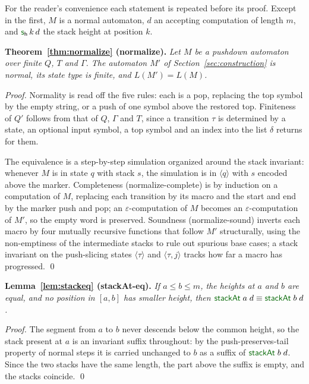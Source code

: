 \documentclass[runningheads]{llncs}
\newcommand{\greenFG}[1]{\textcolor[rgb]{0,0.4,0}{#1}}
\newcommand{\F}[1]{{\greenFG{\textsf{#1}}}}     %
\newcommand{\kG}{\ensuremath{\Gamma}}   %
\begin{document}
For the reader's convenience each statement is repeated before its proof. Except
in the first, $M$ is a normal automaton, $d$ an accepting computation of length
$m$, and $\F{s}_{\mathsf h}\,k\,d$ the stack height at position $k$.

\medskip
\noindent\textbf{Theorem~\ref{thm:normalize} (\F{normalize}).}
\emph{Let $M$ be a pushdown automaton over finite $Q$, $T$ and $\kG$. The
automaton $M'$ of Section~\ref{sec:construction} is normal, its state type is
finite, and $L(M') = L(M)$.}
\begin{proof}
Normality is read off the five rules: each is a pop, replacing the top symbol by
the empty string, or a push of one symbol above the restored top. Finiteness of
$Q'$ follows from that of $Q$, $\kG$ and $T$, since a transition $\tau$ is
determined by a state, an optional input symbol, a top symbol and an index into
the list $\delta$ returns for them.

The equivalence is a step-by-step simulation organized around the stack
invariant: whenever $M$ is in state $q$ with stack $s$, the simulation is in
$\langle q\rangle$ with $s$ encoded above the marker. Completeness
(\F{normalize-complete}) is by induction on a computation of $M$, replacing each
transition by its macro and the start and end by the marker push and pop; an
$\varepsilon$-computation of $M$ becomes an $\varepsilon$-computation of $M'$, so
the empty word is preserved. Soundness (\F{normalize-sound}) inverts each macro
by four mutually recursive functions that follow $M'$ structurally, using the
non-emptiness of the intermediate stacks to rule out spurious base cases; a stack
invariant on the push-slicing states $\langle\tau\rangle$ and
$\langle\tau,j\rangle$ tracks how far a macro has progressed. \qed
\end{proof}

\medskip
\noindent\textbf{Lemma~\ref{lem:stackeq} (\F{stackAt-eq}).}
\emph{If $a \leq b \leq m$, the heights at $a$ and $b$ are equal, and no position
in $[a,b]$ has smaller height, then
$\F{stackAt}\;a\;d \equiv \F{stackAt}\;b\;d$.}
\begin{proof}
The segment from $a$ to $b$ never descends below the common height, so the stack
present at $a$ is an invariant suffix throughout: by the push-preserves-tail
property of normal steps it is carried unchanged to $b$ as a suffix of
$\F{stackAt}\;b\;d$. Since the two stacks have the same length, the part above
the suffix is empty, and the stacks coincide. \qed
\end{proof}
\end{document}
